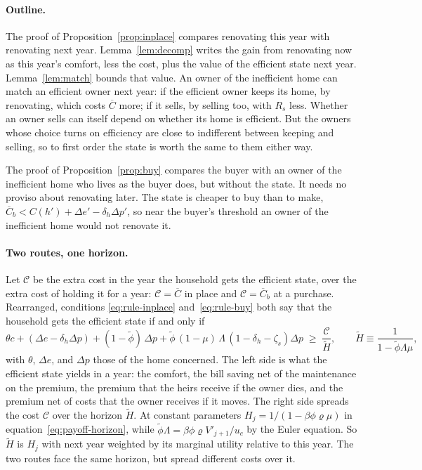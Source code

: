 \paragraph{Outline.}
The proof of Proposition~\ref{prop:inplace} compares renovating this year
with renovating next year. Lemma~\ref{lem:decomp} writes the gain from
renovating now as this year's comfort, less the cost, plus the value of the
efficient state next year. Lemma~\ref{lem:match} bounds that value. An owner
of the inefficient home can match an efficient owner next year: if the
efficient owner keeps its home, by renovating, which costs $\overline C$
more; if it sells, by selling too, with $R_s$ less. Whether an owner sells
can itself depend on whether its home is efficient. But the owners whose
choice turns on efficiency are close to indifferent between keeping and
selling, so to first order the state is worth the same to them either way.

The proof of Proposition~\ref{prop:buy} compares the buyer with an owner of
the inefficient home who lives as the buyer does, but without the state. It
needs no proviso about renovating later. The state is cheaper to buy than
to make, $\overline C_b<C(h')+\Delta e'-\delta_h\Delta p'$, so near the
buyer's threshold an owner of the inefficient home would not renovate it.

\paragraph{Two routes, one horizon.}
Let $\mathcal C$ be the extra cost in the year the household gets the
efficient state, over the extra cost of holding it for a year:
$\mathcal C=\overline C$ in place and $\mathcal C=\overline C_b$ at a
purchase. Rearranged, conditions \eqref{eq:rule-inplace}
and~\eqref{eq:rule-buy} both say that the household gets the efficient
state if and only if
\begin{equation}
  \theta c+(\Delta e-\delta_h\Delta p)+(1-\tilde\phi)\,\Delta p
  +\tilde\phi\,(1-\mu)\,\Lambda\,(1-\delta_h-\zeta_s)\Delta p
  \;\ge\;\frac{\mathcal C}{\widetilde H},
  \qquad
  \widetilde H\equiv\frac{1}{1-\tilde\phi\Lambda\mu},
  \label{eq:common}
\end{equation}
with $\theta$, $\Delta e$, and $\Delta p$ those of the home concerned. The
left side is what the efficient state yields in a year: the comfort, the
bill saving net of the maintenance on the premium, the premium that the
heirs receive if the owner dies, and the premium net of costs that the
owner receives if it moves. The right side spreads the cost $\mathcal C$
over the horizon $\widetilde H$. At constant parameters
$H_j=1/(1-\beta\phi\varrho\mu)$ in equation~\eqref{eq:payoff-horizon},
while $\tilde\phi\Lambda=\beta\phi\varrho V'_{j+1}/u_c$ by the Euler
equation. So $\widetilde H$ is $H_j$ with next year weighted by its
marginal utility relative to this year. The two routes face the same
horizon, but spread different costs over it.

